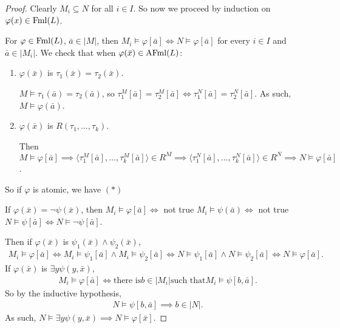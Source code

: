 \documentclass{report}
\begin{document}
\begin{proof}
    Clearly $M_i \subseteq N$ for all $i \in I$. So now we proceed by induction on $\varphi(x) \in \text{Fml}(L)$. 

    For $\varphi \in \text{Fml}(L)$, $\bar a \in |M|$, then $M_i \models \varphi[\bar a] \iff N \models \varphi[\bar a]$ for every $i \in I$ and $\bar a \in |M_i|$.
    We check that when $\varphi(\bar x) \in \text{AFml}(L)$:
    \begin{enumerate}[label=(\alph*)]
        \item $\varphi(\bar x)$ is $\tau_1(\bar x) = \tau_2(\bar x)$.
        
        $M \models \tau_1(\bar a) = \tau_2(\bar a)$, so $\tau_1^M[\bar a] = \tau_2^M[\bar a] \iff \tau_1^N[\bar a] = \tau_2^N[\bar a]$. As such, $M \models\varphi(\bar a)$. 
        \item $\varphi(\bar x)$ is $R(\tau_1, \ldots, \tau_k)$. 
        
        Then $M \models \varphi[\bar a] \implies \langle \tau_1^M[\bar a], \ldots, \tau_k^M[\bar a] \rangle \in R^M \implies \langle \tau_1^N[\bar a], \ldots, \tau_k^N[\bar a] \rangle \in R^N \implies N \models \varphi[\bar a]$. 
    \end{enumerate} 

    So if $\varphi$ is atomic, we have $(*)$

    If $\varphi(\bar x) = \neg \psi(\bar x)$, then $M_i \models \varphi[\bar a] \iff$ not true $M_i \models \psi(\bar a) \iff$ not true $N \models \psi[\bar a] \iff N \models \neg\psi[\bar a]$. 

    Then if $\varphi(\bar x)$ is $\psi_1(\bar x) \land \psi_2(\bar x)$,
    \begin{align*}
        M_i \models \varphi[\bar a] \iff M_i \models \psi_1[\bar a] \land M_i \models \psi_2[\bar a] \iff N \models \psi_1[\bar a] \land N \models \psi_2[\bar a] \iff N \models \varphi[\bar a].
    \end{align*}
    If $\varphi(\bar x)$ is $\exists y \psi(y, \bar x)$,
    \begin{align*}
        M_i \models \varphi[\bar a] \iff \text{there is} b \in |M_i| \text{such that} M_i \models \psi[b, \bar a].
    \end{align*}
    So by the inductive hypothesis,
    \begin{align*}
        N \models \psi[b, \bar a] \implies b \in |N|.
    \end{align*}
    As such, $N \models \exists y \psi(y, \bar x) \implies N \models \varphi[\bar x]$.


\end{proof}
\end{document}
